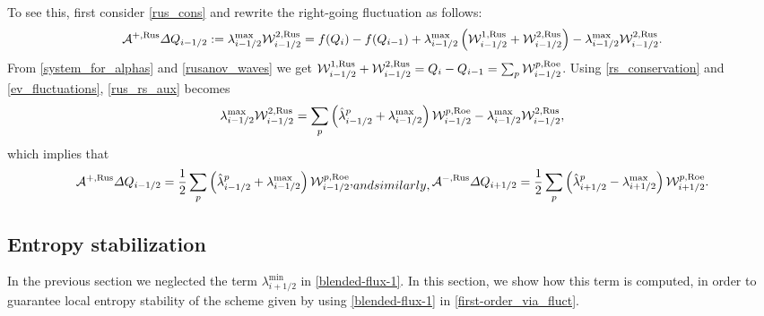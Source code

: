 \documentclass[preprint, 11pt]{article}
\newcommand{\W}{{\mathcal W}}
\newcommand{\A}{{\mathcal A}}
\newcommand{\iph}{{i+1/2}}
\newcommand{\bff}{{f}}
\newcommand{\bfq}{{Q}}
\newcommand{\Rus}{{\rm Rus}}
\newcommand{\Roe}{{\rm Roe}}
\begin{document}
To see this, first consider \eqref{rus_cons} and rewrite the right-going fluctuation as follows:
\begin{align}\label{rus_rs_aux}
  \A^{+,\Rus}\Delta Q_{i-1/2}:=\lambda_{i-1/2}^{\max}\W_{i-1/2}^{2,\Rus}
  = \bff(\bfq_{i})-\bff(\bfq_{i-1}) + \lambda_{i-1/2}^{\max}\left(\W_{i-1/2}^{1,\Rus}+\W_{i-1/2}^{2,\Rus}\right)
  -\lambda_{i-1/2}^{\max}\W_{i-1/2}^{2,\Rus}.
\end{align}
From \eqref{system_for_alphas} and \eqref{rusanov_waves} we get
$\W^{1,\Rus}_{i-1/2}+\W^{2,\Rus}_{i-1/2}=\bfq_i-\bfq_{i-1}=\sum_p\W_{i-1/2}^{p,\Roe}$.
Using \eqref{rs_conservation} and \eqref{ev_fluctuations}, \eqref{rus_rs_aux} becomes
\begin{align*}
  \lambda_{i-1/2}^{\max}\W_{i-1/2}^{2,\Rus}
  = \sum_p \left(\hat \lambda_{i-1/2}^p + \lambda_{i-1/2}^{\max}\right)\W_{i-1/2}^{p,\Roe}
  -\lambda_{i-1/2}^{\max}\W_{i-1/2}^{2,\Rus},
\end{align*}
which implies that
\begin{subequations}\label{fluct_rus}
\begin{align}
  \A^{+,\Rus}\Delta Q_{i-1/2}=\frac{1}{2}\sum_p\left(\hat \lambda_{i-1/2}^p + \lambda_{i-1/2}^{\max}\right)\W_{i-1/2}^{p,\Roe},
\end{align}
and similarly,
\begin{align}
  \A^{-,\Rus}\Delta Q_{i+1/2}=\frac{1}{2}\sum_p\left(\hat \lambda_{i+1/2}^p - \lambda_{i+1/2}^{\max}\right)\W_{i+1/2}^{p,\Roe}.
\end{align}
\end{subequations}


\subsection{Entropy stabilization}\label{sec:entropy_stable}
In the previous section we neglected the term $\lambda^{\min}_\iph$ in
\eqref{blended-flux-1}.  In this section, we show how this term is computed,
in order to guarantee local entropy stability of the scheme given by using
\eqref{blended-flux-1} in \eqref{first-order_via_fluct}.
\end{document}
